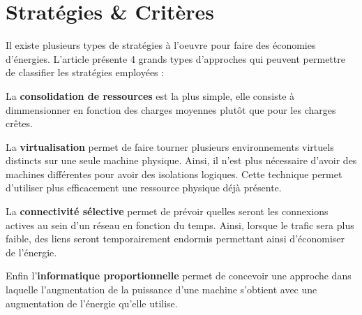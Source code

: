 \section*{Stratégies \& Critères}

Il existe plusieurs types de stratégies à l'oeuvre pour faire des économies
d'énergies. L'article présente 4 grands types d'approches qui peuvent permettre
de classifier les stratégies employées :

La \textbf{consolidation de ressources} est la plus simple, elle consiste à
dimmensionner en fonction des charges moyennes plutôt que pour les charges
crêtes.

La \textbf{virtualisation} permet de faire tourner plusieurs environnements
virtuels distincts sur une seule machine physique. Ainsi, il n'est plus
nécessaire d'avoir des machines différentes pour avoir des isolations logiques.
Cette technique permet d'utiliser plus efficacement une ressource physique déjà
présente.

La \textbf{connectivité sélective} permet de prévoir quelles seront les
connexions actives au sein d'un réseau en fonction du temps.  Ainsi, lorsque le
trafic sera plus faible, des liens seront temporairement endormis permettant
ainsi d'économiser de l'énergie.

Enfin l'\textbf{informatique proportionnelle} permet de concevoir une approche
dans laquelle l'augmentation de la puissance d'une machine s'obtient avec une
augmentation de l'énergie qu'elle utilise. 
